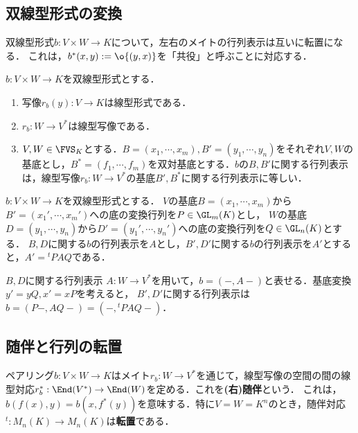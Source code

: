 \documentclass[uplatex, dvipdfmx]{jsreport}
\begin{document}
\subsection{双線型形式の変換}

\begin{tcolorbox}[colframe=ForestGreen, colback=ForestGreen!10!white,breakable,colbacktitle=ForestGreen!40!white,coltitle=black,fonttitle=\bfseries\sffamily,
title=]
    双線型形式$b:V\times W\to K$について，左右のメイトの行列表示は互いに転置になる．
    これは，$b^*(x,y):=\o{(y,x)}$を「共役」と呼ぶことに対応する．
\end{tcolorbox}

\begin{proposition}[双線型形式の行列表示の特徴付け]\label{prop-characterization-of-matrix-representation-of-bilinar-form}
    $b:V\times W\to K$を双線型形式とする．
    \begin{enumerate}
        \item 写像$r_b(y):V\to K$は線型形式である．
        \item $r_b:W\to V^*$は線型写像である．
        \item $V,W\in\FVS_K$とする．$B=(x_1,\cdots,x_m),B'=(y_1,\cdots,y_n)$をそれぞれ$V,W$の基底とし，$B^*=(f_1,\cdots,f_m)$を双対基底とする．$b$の$B,B'$に関する行列表示は，線型写像$r_b:W\to V^*$の基底$B',B^*$に関する行列表示に等しい．
    \end{enumerate}
\end{proposition}

\begin{proposition}[双線型形式の変換]
    $b:V\times W\to K$を双線型形式とする．
    $V$の基底$B=(x_1,\cdots,x_m)$から$B'=(x_1',\cdots,x_m')$への底の変換行列を$P\in\GL_m(K)$とし，
    $W$の基底$D=(y_1,\cdots,y_n)$から$D'=(y_1',\cdots,y_n')$への底の変換行列を$Q\in\GL_n(K)$とする．
    $B,D$に関する$b$の行列表示を$A$とし，$B',D'$に関する$b$の行列表示を$A'$とすると，$A'={}^t\!PAQ$である．
\end{proposition}
\begin{Proof}
    $B,D$に関する行列表示
    $A:W\to V^*$を用いて，$b=(-,A-)$と表せる．基底変換$y'=yQ,x'=xP$を考えると，
    $B',D'$に関する行列表示は$b=(P-,AQ-)=(-,{}^t\!PAQ-)$．
\end{Proof}

\subsection{随伴と行列の転置}

\begin{tcolorbox}[colframe=ForestGreen, colback=ForestGreen!10!white,breakable,colbacktitle=ForestGreen!40!white,coltitle=black,fonttitle=\bfseries\sffamily,
title=]
    ペアリング$b:V\times W\to K$はメイト$r_b:W\to V^*$を通じて，線型写像の空間の間の線型対応$r_b^*:\End(V^*)\to\End(W)$を定める．これを\textbf{(右)随伴}という．
    これは，$b(f(x),y)=b(x,f^*(y))$を意味する．特に$V=W=K^n$のとき，随伴対応${}^t\!:M_n(K)\to M_n(K)$は\textbf{転置}である．
\end{tcolorbox}
\end{document}
